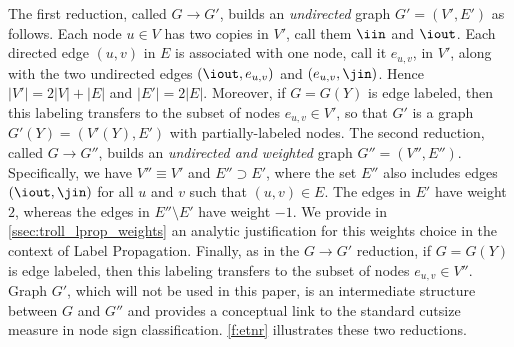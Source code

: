 The first reduction, called $G \rightarrow G'$, builds an \emph{undirected} graph $G' = (V',E')$ as
follows. Each node $u \in V$ has two copies in $V'$, call them $\iin$ and $\iout$. Each directed
edge $(u,v)$ in $E$ is associated with one node, call it $e_{u,v}$, in $V'$, along with the two
undirected edges $(\iout,e_{u,v})$ and $(e_{u,v},\jin)$. Hence $|V'| = 2|V|+|E|$ and $|E'| = 2|E|$.
Moreover, if $G = G(Y)$ is edge labeled, then this labeling transfers to the subset of nodes
$e_{u,v} \in V'$, so that $G'$ is a graph $G'(Y) = (V'(Y),E')$ with partially-labeled nodes. The
second reduction, called $G \rightarrow G''$, builds an \emph{undirected and weighted} graph $G'' =
(V'',E'')$. Specifically, we have $V'' \equiv V'$ and $E'' \supset E'$, where the set $E''$ also
includes edges $(\iout,\jin)$ for all $u$ and $v$ such that $(u,v) \in E$. The edges in $E'$ have
weight $2$, whereas the edges in $E''\setminus E'$ have weight $-1$. We provide in
\autoref{ssec:troll_lprop_weights} an analytic justification for this weights choice in the context
of Label Propagation. Finally, as in the $G \rightarrow G'$ reduction, if $G = G(Y)$ is edge
labeled, then this labeling transfers to the subset of nodes $e_{u,v} \in V''$. Graph $G'$, which
will not be used in this paper, is an intermediate structure between $G$ and $G''$ and provides a
conceptual link to the standard cutsize measure in node sign classification. \autoref{f:etnr}
illustrates these two reductions. 

